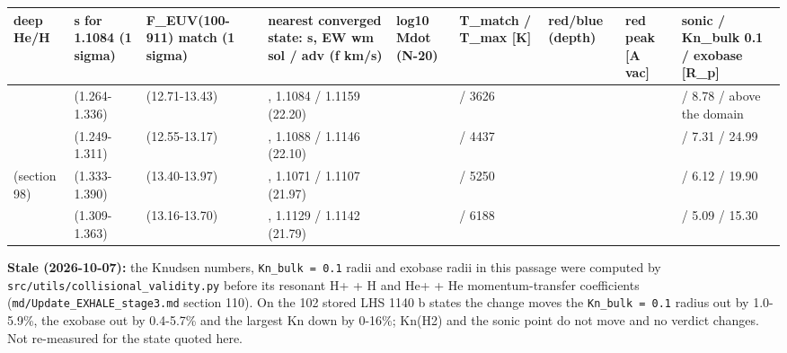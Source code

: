 \documentclass[english,a4paper]{my_memo}
\begin{document}
{\def\LTcaptype{none} %
{\small
\begin{longtable}[]{@{}>{\raggedright\arraybackslash}p{\dimexpr(\linewidth-18\tabcolsep)/9\relax}>{\raggedright\arraybackslash}p{\dimexpr(\linewidth-18\tabcolsep)/9\relax}>{\raggedright\arraybackslash}p{\dimexpr(\linewidth-18\tabcolsep)/9\relax}>{\raggedright\arraybackslash}p{\dimexpr(\linewidth-18\tabcolsep)/9\relax}>{\raggedright\arraybackslash}p{\dimexpr(\linewidth-18\tabcolsep)/9\relax}>{\raggedright\arraybackslash}p{\dimexpr(\linewidth-18\tabcolsep)/9\relax}>{\raggedright\arraybackslash}p{\dimexpr(\linewidth-18\tabcolsep)/9\relax}>{\raggedright\arraybackslash}p{\dimexpr(\linewidth-18\tabcolsep)/9\relax}>{\raggedright\arraybackslash}p{\dimexpr(\linewidth-18\tabcolsep)/9\relax}@{}}
\toprule\noalign{}
deep He/H & s for 1.1084 (1 sigma) & F\_EUV(100-911) match (1 sigma) & nearest converged state: s, EW wm sol / adv (f km/s) & log10 Mdot (N-20) & T\_match / T\_max {[}K{]} & red/blue (depth) & red peak {[}A vac{]} & sonic / Kn\_bulk 0.1 / exobase {[}R\_p{]} \\
\midrule\noalign{}
\endhead
\bottomrule\noalign{}
\endlastfoot
0.65 & 1.300 (1.264-1.336) & 13.07 (12.71-13.43) & 1.3, 1.1084 / 1.1159 (22.20) & 8.2408 & 414.9 / 3626 & 7.60 & 10833.276 & 26.20 / 8.78 / above the domain \\
1.2 & 1.280 (1.249-1.311) & 12.86 (12.55-13.17) & 1.28, 1.1088 / 1.1146 (22.10) & 8.1379 & 390.4 / 4437 & 7.56 & 10833.265 & 25.32 / 7.31 / 24.99 \\
2.09 (section 98) & 1.361 (1.333-1.390) & 13.68 (13.40-13.97) & 1.36, 1.1071 / 1.1107 (21.97) & 8.0652 & 350.4 / 5250 & 7.51 & 10833.272 & 23.77 / 6.12 / 19.90 \\
5 & 1.336 (1.309-1.363) & 13.43 (13.16-13.70) & 1.34, 1.1129 / 1.1142 (21.79) & 8.0000 & 326.8 / 6188 & 7.46 & 10833.266 & 22.67 / 5.09 / 15.30 \\
\end{longtable}
}
}

\textbf{Stale (2026-10-07):} the Knudsen numbers, \texttt{Kn\_bulk\ =\ 0.1} radii and exobase radii in this passage were computed by \texttt{src/utils/collisional\_validity.py} before its resonant H+ + H and He+ + He momentum-transfer coefficients (\texttt{md/Update\_EXHALE\_stage3.md} section 110). On the 102 stored LHS 1140 b states the change moves the \texttt{Kn\_bulk\ =\ 0.1} radius out by 1.0-5.9\%, the exobase out by 0.4-5.7\% and the largest Kn down by 0-16\%; Kn(H2) and the sonic point do not move and no verdict changes. Not re-measured for the state quoted here.
\end{document}

